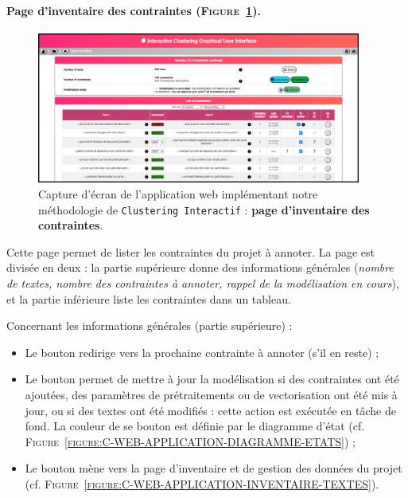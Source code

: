 		
		\paragraph{Page d'inventaire des contraintes (\textsc{Figure~\ref{figure:C-WEB-APPLICATION-INVENTAIRE-CONTRAINTES}}).}
		
			\begin{figure}[H]
				\centering
				\includegraphics[width=0.95\textwidth]{figures/interactive-clustering-application-contraintes}
				\caption{
					Capture d'écran de l'application web implémentant notre méthodologie de \texttt{Clustering Interactif} : \textbf{page d'inventaire des contraintes}.
				}
				\label{figure:C-WEB-APPLICATION-INVENTAIRE-CONTRAINTES}
			\end{figure}
			
			Cette page permet de lister les contraintes du projet à annoter.
			La page est divisée en deux : la partie supérieure donne des informations générales (\textit{nombre de textes, nombre des contraintes à annoter, rappel de la modélisation en cours}), et la partie inférieure liste les contraintes dans un tableau.
			
			Concernant les informations générales (partie supérieure) :
			\begin{itemize}
				\item Le bouton  redirige vers la prochaine contrainte à annoter (s'il en reste) ;
				\item Le bouton  permet de mettre à jour la modélisation si des contraintes ont été ajoutées, des paramètres de prétraitements ou de vectorisation ont été mis à jour, ou si des textes ont été modifiés : cette action est exécutée en tâche de fond.
				La couleur de se bouton est définie par le diagramme d'état (cf. \textsc{Figure~\ref{figure:C-WEB-APPLICATION-DIAGRAMME-ETATS}}) ;
				\item Le bouton  mène vers la page d'inventaire et de gestion des données du projet (cf. \textsc{Figure~\ref{figure:C-WEB-APPLICATION-INVENTAIRE-TEXTES}}).
			\end{itemize}
			
